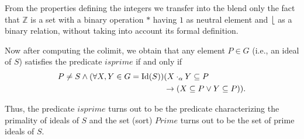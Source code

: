 %
%
 
From the properties defining the integers we
transfer into the blend only the fact that $\mathbb{Z}$ is a set with
a binary operation $*$ having $1$ as neutral element and
$\lfloor$ as a binary relation, without taking into account its formal definition.


Now after computing the colimit, we obtain that
any element $P \in G$
(i.e., an ideal of $S$) satisfies the predicate $isprime$ if and only
if
\begin{align*}
P\neq S \wedge (\forall X,Y\in G={\rm Id}(S)) & (X\cdot_{\alpha}Y\subseteq P\\
                             & \rightarrow (X\subseteq P \vee Y\subseteq P)).
\end{align*}

Thus, the predicate $isprime$ turns out to be the
predicate characterizing the primality of ideals of $S$ and the set
(sort) $Prime$ turns out to be the set of prime ideals of $S$.

